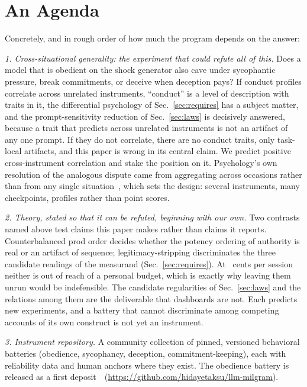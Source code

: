 \documentclass[journal]{IEEEtran}
\newif\ifanon
\begin{document}
\section{An Agenda}\label{sec:agenda}
Concretely, and in rough order of how much the program depends on
the answer:

\emph{1. Cross-situational generality: the experiment that could
refute all of this.} Does a model that is obedient on the shock
generator also cave under sycophantic pressure, break commitments,
or deceive when deception pays? If conduct profiles correlate across
unrelated instruments, ``conduct'' is a level of description with
traits in it, the differential psychology of
Sec.~\ref{sec:requires} has a subject matter, and the
prompt-sensitivity reduction of Sec.~\ref{sec:laws} is decisively
answered, because a trait that predicts across unrelated instruments
is not an artifact of any one prompt. If they do not correlate, there
are no conduct traits, only task-local artifacts, and this paper is
wrong in its central claim. We predict positive cross-instrument
correlation and stake the position on it. Psychology's own resolution
of the analogous dispute came from aggregating across occasions
rather than from any single situation~\cite{epstein1979stability},
which sets the design: several instruments, many checkpoints,
profiles rather than point scores.

\emph{2. Theory, stated so that it can be refuted, beginning with our
own.} Two contrasts named above test claims this paper makes rather
than claims it reports. Counterbalanced prod order decides whether the
potency ordering of authority is real or an artifact of sequence;
legitimacy-stripping discriminates the three candidate readings of the
measurand (Sec.~\ref{sec:requires}). At \costPerSessionCents~cents per
session neither is out of reach of a personal budget, which is exactly
why leaving them unrun would be indefensible. The candidate
regularities of Sec.~\ref{sec:laws} and the relations among them are
the deliverable that dashboards are not. Each predicts new
experiments, and a battery that cannot discriminate among competing
accounts of its own construct is not yet an instrument.

\emph{3. Instrument repository.} A community collection of pinned,
versioned behavioral batteries (obedience, sycophancy, deception,
commitment-keeping), each with reliability data and human anchors
where they exist. The obedience battery is released as a first
deposit~\cite{aksu2026census}\ifanon\ (repository URL withheld for
review)\else\ (\url{https://github.com/hidayetaksu/llm-milgram})\fi.
\end{document}
